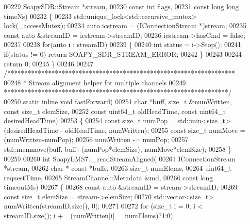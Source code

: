 \begin{DoxyCode}
00229     SoapySDR::Stream *stream,
00230     \textcolor{keyword}{const} \textcolor{keywordtype}{int} flags,
00231     \textcolor{keyword}{const} \textcolor{keywordtype}{long} \textcolor{keywordtype}{long} timeNs)
00232 \{
00233     std::unique\_lock<std::recursive\_mutex> lock(\_accessMutex);
00234     \textcolor{keyword}{auto} icstream = (IConnectionStream *)stream;
00235     \textcolor{keyword}{const} \textcolor{keyword}{auto} &streamID = icstream->streamID;
00236     icstream->hasCmd = \textcolor{keyword}{false};
00237 
00238     \textcolor{keywordflow}{for}(\textcolor{keyword}{auto} i : streamID)
00239     \{
00240         \textcolor{keywordtype}{int} status = i->Stop();
00241         \textcolor{keywordflow}{if}(status != 0) \textcolor{keywordflow}{return} SOAPY\_SDR\_STREAM\_ERROR;
00242     \}
00243 
00244     \textcolor{keywordflow}{return} 0;
00245 \}
00246 
00247 \textcolor{comment}{/*******************************************************************}
00248 \textcolor{comment}{ * Stream alignment helper for multiple channels}
00249 \textcolor{comment}{ ******************************************************************/}
00250 \textcolor{keyword}{static} \textcolor{keyword}{inline} \textcolor{keywordtype}{void} fastForward(
00251     \textcolor{keywordtype}{char} *buff, \textcolor{keywordtype}{size\_t} &numWritten, \textcolor{keyword}{const} \textcolor{keywordtype}{size\_t} elemSize,
00252     \textcolor{keyword}{const} uint64\_t oldHeadTime, \textcolor{keyword}{const} uint64\_t desiredHeadTime)
00253 \{
00254     \textcolor{keyword}{const} \textcolor{keywordtype}{size\_t} numPop = std::min<size\_t>(desiredHeadTime - oldHeadTime, numWritten);
00255     \textcolor{keyword}{const} \textcolor{keywordtype}{size\_t} numMove = (numWritten-numPop);
00256     numWritten -= numPop;
00257     std::memmove(buff, buff+(numPop*elemSize), numMove*elemSize);
00258 \}
00259 
00260 \textcolor{keywordtype}{int} SoapyLMS7::_readStreamAligned(
00261     IConnectionStream *stream,
00262     \textcolor{keywordtype}{char} * \textcolor{keyword}{const} *buffs,
00263     \textcolor{keywordtype}{size\_t} numElems,
00264     uint64\_t requestTime,
00265     StreamChannel::Metadata &md,
00266     \textcolor{keyword}{const} \textcolor{keywordtype}{long} timeoutMs)
00267 \{
00268     \textcolor{keyword}{const} \textcolor{keyword}{auto} &streamID = stream->streamID;
00269     \textcolor{keyword}{const} \textcolor{keywordtype}{size\_t} elemSize = stream->elemSize;
00270     std::vector<size\_t> numWritten(streamID.size(), 0);
00271 
00272     \textcolor{keywordflow}{for} (\textcolor{keywordtype}{size\_t} i = 0; i < streamID.size(); i += (numWritten[i]==numElems)?1:0)

\end{DoxyCode}
